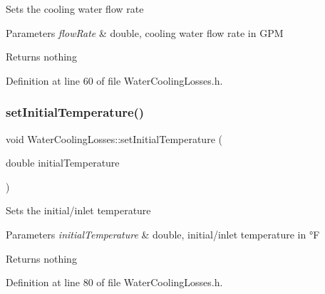 Sets the cooling water flow rate


\begin{DoxyParams}{Parameters}
{\em flow\+Rate} & double, cooling water flow rate in G\+PM\\
\hline
\end{DoxyParams}
\begin{DoxyReturn}{Returns}
nothing 
\end{DoxyReturn}


Definition at line 60 of file Water\+Cooling\+Losses.\+h.

\mbox{\label{class_water_cooling_losses_a56b0b64b71ecbece780622d5f4b536ba}} 
\subsubsection{\texorpdfstring{set\+Initial\+Temperature()}{setInitialTemperature()}\hspace{0.1cm}{\footnotesize\ttfamily [1/3]}}
{\footnotesize\ttfamily void Water\+Cooling\+Losses\+::set\+Initial\+Temperature (\begin{DoxyParamCaption}\item[{double}]{initial\+Temperature }\end{DoxyParamCaption})\hspace{0.3cm}{\ttfamily [inline]}}

Sets the initial/inlet temperature


\begin{DoxyParams}{Parameters}
{\em initial\+Temperature} & double, initial/inlet temperature in °F\\
\hline
\end{DoxyParams}
\begin{DoxyReturn}{Returns}
nothing 
\end{DoxyReturn}


Definition at line 80 of file Water\+Cooling\+Losses.\+h.

\mbox{\label{class_water_cooling_losses_a56b0b64b71ecbece780622d5f4b536ba}} 
